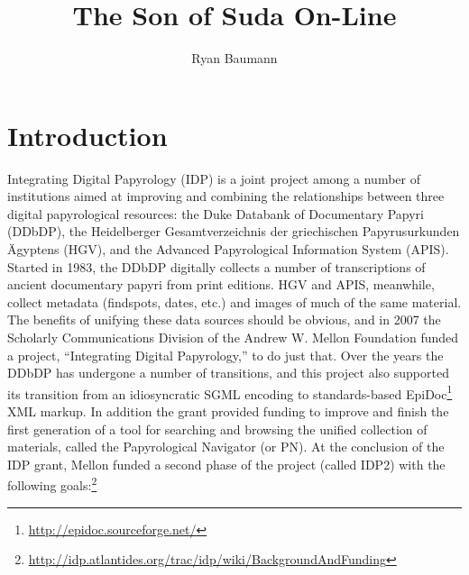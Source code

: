 \documentclass[]{article}
\title{The Son of Suda On-Line}
\author{Ryan Baumann}
\date{}
\begin{document}
\ifpdf
{}
\else
{}
\fi

\maketitle

\section*{Introduction}

Integrating Digital Papyrology (IDP) is a joint project among a number of institutions aimed at improving and combining the relationships between three digital papyrological resources: the Duke Databank of Documentary Papyri (DDbDP), the Heidelberger Gesamtverzeichnis der griechischen Papyrusurkunden \"{A}gyptens (HGV), and the Advanced Papyrological Information System (APIS). Started in 1983, the DDbDP digitally collects a number of transcriptions of ancient documentary papyri from print editions. HGV and APIS, meanwhile, collect metadata (findspots, dates, etc.) and images of much of the same material. The benefits of unifying these data sources should be obvious, and in 2007 the Scholarly Communications Division of the Andrew W. Mellon Foundation funded a project, “Integrating Digital Papyrology,” to do just that. Over the years the DDbDP has undergone a number of transitions, and this project also supported its transition from an idiosyncratic SGML encoding to standards-based EpiDoc\footnote{\url{http://epidoc.sourceforge.net/}} XML markup. In addition the grant provided funding to improve and finish the first generation of a tool for searching and browsing the unified collection of materials, called the Papyrological Navigator (or PN). At the conclusion of the IDP grant, Mellon funded a second phase of the project (called IDP2) with the following goals:\footnote{\url{http://idp.atlantides.org/trac/idp/wiki/BackgroundAndFunding}}
\end{document}
